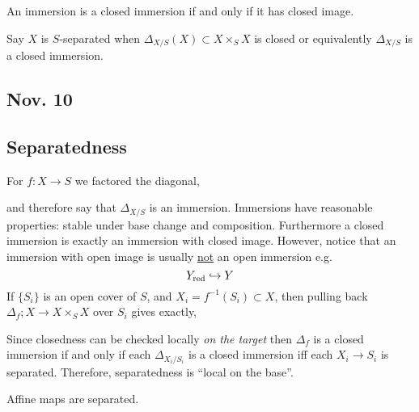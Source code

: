 \documentclass[12pt]{article}
\begin{document}
\begin{lemma}
An immersion is a closed immersion if and only if it has closed image.
\end{lemma}

\begin{defn}
Say $X$ is $S$-separated when $\Delta_{X/S}(X) \subset X \times_S X$ is closed or equivalently $\Delta_{X/S}$ is a closed immersion.
\end{defn}

\subsection{Nov. 10}

\subsection{Separatedness}

For $f : X \to S$ we factored the diagonal,
\begin{center}
\end{center}
and therefore say that $\Delta_{X/S}$ is an immersion. Immersions have reasonable properties: stable under base change and composition. Furthermore a closed immersion is exactly an immersion with closed image. However, notice that an immersion with open image is usually \underline{not} an open immersion e.g. 
\[ Y_{\mathrm{red}} \hookrightarrow Y \]
If $\{ S_i \}$ is an open cover of $S$, and $X_i = f^{-1}(S_i) \subset X$, then pulling back $\Delta_f ; X \to X \times_S X$ over $S_i$ gives exactly,
\begin{center}
\end{center}
Since closedness can be checked locally \textit{on the target} then $\Delta_f$ is a closed immersion if and only if each $\Delta_{X_i / S_i}$ is a closed immersion iff each $X_i \to S_i$ is separated. Therefore, separatedness is ``local on the base''. 

\begin{prop}
Affine maps are separated.
\end{prop}
\end{document}
